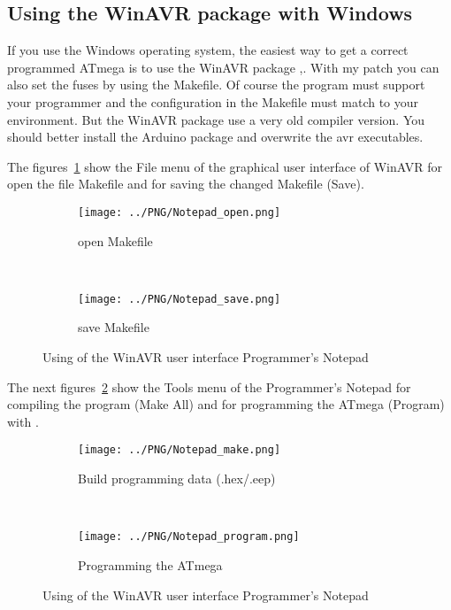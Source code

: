\subsection{Using the WinAVR package with Windows}
If you use the Windows operating system, the easiest way to get a correct programmed
ATmega is to use the WinAVR package \cite{winavr1},\cite{winavr2}.
With my patch \cite{winavr3} you can also set the fuses by using the Makefile.
Of course the  program must support your programmer and the configuration
in the Makefile must match to your environment.
But the WinAVR package use a very old compiler version. You should better install
the Arduino package and overwrite the avr executables.

The figures~\ref{fig:WinAVR1} show the File menu of the graphical user interface of WinAVR for
open the file Makefile and for saving the changed Makefile (Save).

\begin{figure}[H]
  \begin{subfigure}[b]{.5\textwidth}
    \centering
    \texttt{[image: ../PNG/Notepad\_open.png]}
    \caption{open Makefile}
  \end{subfigure}
  ~
  \begin{subfigure}[b]{.5\textwidth}
    \centering
    \texttt{[image: ../PNG/Notepad\_save.png]}
    \caption{save Makefile}
  \end{subfigure}
  \caption{Using of the WinAVR user interface Programmer's Notepad}
  \label{fig:WinAVR1}
\end{figure}

The next figures~\ref{fig:WinAVR2} show the Tools menu of the Programmer's Notepad
for compiling the program (Make All) and for programming the ATmega (Program) with .

\begin{figure}[H]
  \begin{subfigure}[b]{.5\textwidth}
    \centering
    \texttt{[image: ../PNG/Notepad\_make.png]}
    \caption{Build programming data (.hex/.eep)}
  \end{subfigure}
  ~
  \begin{subfigure}[b]{.5\textwidth}
    \centering
    \texttt{[image: ../PNG/Notepad\_program.png]}
    \caption{Programming the ATmega}
  \end{subfigure}
  \caption{Using of the WinAVR user interface Programmer's Notepad}
  \label{fig:WinAVR2}
\end{figure}



